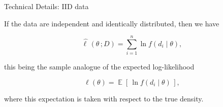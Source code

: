 \begin{frame}{Technical Details: IID data}

If the data are independent and identically distributed, then we have

$${\widehat{\ell\,}}(\theta \,;D)=\sum_{i=1}^{n}\ln f(d_{i}\mid \theta),$$

this being the sample analogue of the expected log-likelihood 

$$\ell(\theta)=\operatorname{\mathbb{E}}[\,\ln f(d_{i}\mid \theta)\,],$$

where this expectation is taken with respect to the true density.
\end{frame}

